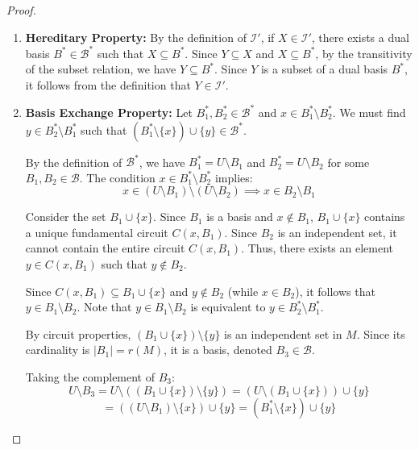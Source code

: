 \documentclass[12pt,a4paper]{article}
\theoremstyle{definition}
\begin{document}
\begin{enumerate}
\begin{enumerate}
\begin{proof}
        \begin{enumerate}
            \item \textbf{Hereditary Property:} By the definition of $\mathcal{I}'$, if $X \in \mathcal{I}'$, there exists a dual basis $B^* \in \mathcal{B}^*$ such that $X \subseteq B^*$. 
            Since $Y \subseteq X$ and $X \subseteq B^*$, by the transitivity of the subset relation, we have $Y \subseteq B^*$.
            Since $Y$ is a subset of a dual basis $B^*$, it follows from the definition that $Y \in \mathcal{I}'$.
            \item \textbf{Basis Exchange Property:} Let $B_1^*, B_2^* \in \mathcal{B}^*$ and $x \in B_1^* \setminus B_2^*$. We must find $y \in B_2^* \setminus B_1^*$ such that $(B_1^* \setminus \{x\}) \cup \{y\} \in \mathcal{B}^*$.
            
            By the definition of $\mathcal{B}^*$, we have $B_1^* = U \setminus B_1$ and $B_2^* = U \setminus B_2$ for some $B_1, B_2 \in \mathcal{B}$. The condition $x \in B_1^* \setminus B_2^*$ implies:
            \[ x \in (U \setminus B_1) \setminus (U \setminus B_2) \implies x \in B_2 \setminus B_1 \]
            
            Consider the set $B_1 \cup \{x\}$. Since $B_1$ is a basis and $x \notin B_1$, $B_1 \cup \{x\}$ contains a unique fundamental circuit $C(x, B_1)$. Since $B_2$ is an independent set, it cannot contain the entire circuit $C(x, B_1)$. Thus, there exists an element $y \in C(x, B_1)$ such that $y \notin B_2$. 
            
            Since $C(x, B_1) \subseteq B_1 \cup \{x\}$ and $y \notin B_2$ (while $x \in B_2$), it follows that $y \in B_1 \setminus B_2$. Note that $y \in B_1 \setminus B_2$ is equivalent to $y \in B_2^* \setminus B_1^*$.
            
            By circuit properties, $(B_1 \cup \{x\}) \setminus \{y\}$ is an independent set in $M$. Since its cardinality is $|B_1| = r(M)$, it is a basis, denoted $B_3 \in \mathcal{B}$.
            
            Taking the complement of $B_3$:
            \[ U \setminus B_3 = U \setminus ((B_1 \cup \{x\}) \setminus \{y\}) = (U \setminus (B_1 \cup \{x\})) \cup \{y\} \]
            \[ = ((U \setminus B_1) \setminus \{x\}) \cup \{y\} = (B_1^* \setminus \{x\}) \cup \{y\} \]
            

\end{enumerate}
\end{proof}
\end{enumerate}
\end{enumerate}
\end{document}
